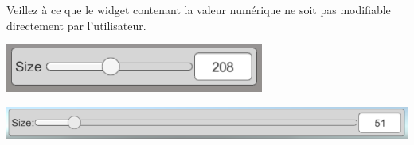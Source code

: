 \documentclass[a4paper,10pt]{article}
\begin{document}
Veillez à ce que le widget contenant la valeur numérique ne soit pas modifiable directement par l'utilisateur.

\begin{center}
	\includegraphics[width=0.6\linewidth]{rc/ui_complexslider_layout}

	\includegraphics[width=0.8\linewidth]{rc/ui_complexslider_layout_v2}
	
\end{center}
\end{document}
